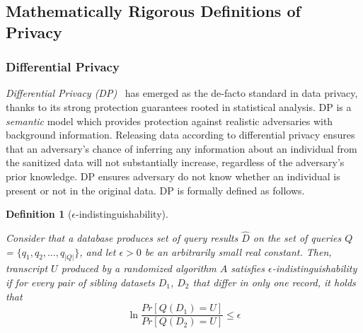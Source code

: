 \documentclass{USC-Thesis}
\numberwithin{equation}{chapter}
\begin{document}
\subsection{Mathematically Rigorous Definitions of Privacy}
\subsubsection{Differential Privacy}
{\em Differential Privacy (DP)}~\cite{dwork2006differential} has emerged as the de-facto standard in data privacy, thanks to its strong protection guarantees rooted in statistical analysis. DP is a {\em semantic} model which provides protection against realistic adversaries with background information. Releasing data according to differential privacy ensures that an adversary’s chance of inferring any information about an individual from the sanitized data will not substantially increase, regardless of the adversary's prior knowledge. DP ensures adversary do not know whether an individual is present or not in the original data. DP is formally defined as follows.


\newtheorem{differential_privacy}[definition]{Definition}\label{differential_privacy}
\begin{differential_privacy}[$\epsilon$-indistinguishability]~\cite{dwork2006calibrating}

Consider that a database produces set of query results $\hat{D}$ on the set of queries $Q$ = $\{q_1, q_2, \ldots, q_{|Q|}\}$, and let $\epsilon>0$ be an arbitrarily small real constant. Then, transcript $U$ produced by a randomized algorithm $A$ satisfies $\epsilon$-indistinguishability if for every pair of sibling datasets $D_1$, $D_2$ that differ in only one record, it holds that
$$\ln \frac{Pr[Q(D_1) = U]}{Pr[Q(D_2) = U]} \le \epsilon$$
\end{differential_privacy}
\end{document}
